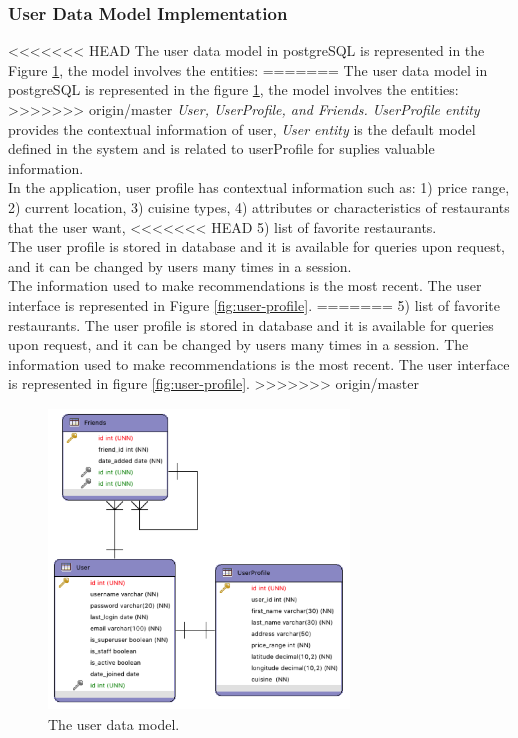 \subsubsection{User Data Model Implementation} 

<<<<<<< HEAD
The user data model in postgreSQL is represented in the 
Figure  \ref{fig:datausermodel}, the model involves the entities:
=======
The user data model in postgreSQL is represented in the figure
\ref{fig:datausermodel}, the model involves the entities:
>>>>>>> origin/master
\textit{User, UserProfile, and Friends.} \textit{UserProfile entity}
provides the contextual information of user, \textit{User entity} is
the default model defined in the system and is related to userProfile
for suplies valuable information. \\
In the application, user profile has contextual
information such as: 1) price range, 2) current location, 3) cuisine
types, 4) attributes or characteristics of restaurants that the user want, 
<<<<<<< HEAD
5) list of  favorite restaurants.  \\ 
The user profile is stored in database and it is available for 
queries upon request, and it can be changed by users many times 
in a session. \\ The information used to make recommendations 
is the most recent. The user interface is represented in 
Figure  \ref{fig:user-profile}.
=======
5) list of  favorite restaurants.  
The user profile is stored in database and it is available for 
queries upon request, and it can be changed by users many times 
in a session. The information used to make recommendations 
is the most recent. The user interface is represented in 
figure \ref{fig:user-profile}.
>>>>>>> origin/master
\begin{figure}
\captionsetup{font=footnotesize}
\centering
\includegraphics[width=8cm,height=8cm,keepaspectratio]
{img/data-usermodel.png}
\caption{The user data model.}
\label{fig:datausermodel}     
\end{figure}
